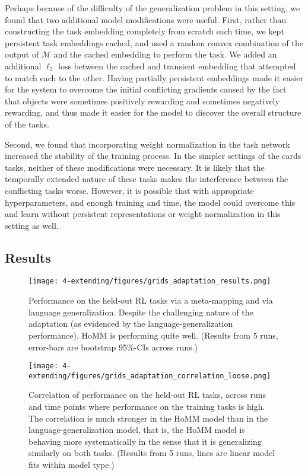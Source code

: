 Perhaps because of the difficulty of the generalization problem in this setting, we found that two additional model modifications were useful. First, rather than constructing the task embedding completely from scratch each time, we kept persistent task embeddings cached, and used a random convex combination of the output of \(\mathcal{M}\) and the cached embedding to perform the task. We added an additional \(\ell_2\) loss between the cached and transient embedding that attempted to match each to the other. Having partially persistent embeddings made it easier for the system to overcome the initial conflicting gradients caused by the fact that objects were sometimes positively rewarding and sometimes negatively rewarding, and thus made it easier for the model to discover the overall structure of the tasks. \par
Second, we found that incorporating weight normalization \citep{Salimans2016} in the task network increased the stability of the training process. In the simpler settings of the cards tasks, neither of these modifications were necessary. It is likely that the temporally extended nature of these tasks makes the interference between the conflicting tasks worse. However, it is possible that with appropriate hyperparameters, and enough training and time, the model could overcome this and learn without persistent representations or weight normalization in this setting as well. \par 

\subsection{Results}

\begin{figure}[htb]
\centering
\texttt{[image: 4-extending/figures/grids\_adaptation\_results.png]}
\caption[Performance on the held-out RL tasks.]{Performance on the held-out RL tasks via a meta-mapping and via language generalization. Despite the challenging nature of the adaptation (as evidenced by the language-generalization performance), HoMM is performing quite well. (Results from 5 runs, error-bars are bootstrap 95\%-CIs across runs.)} \label{fig:HoMM_RL_results}
\end{figure}

\begin{figure}[htb]
\centering
\texttt{[image: 4-extending/figures/grids\_adaptation\_correlation\_loose.png]}
\caption[Correlation of performance on the held-out RL tasks.]{Correlation of performance on the held-out RL tasks, across runs and time points where performance on the training tasks is high. The correlation is much stronger in the HoMM model than in the language-generalization model, that is, the HoMM model is behaving more systematically in the sense that it is generalizing similarly on both tasks. (Results from 5 runs, lines are linear model fits within model type.)} \label{fig:HoMM_RL_results:correlation}
\end{figure}

